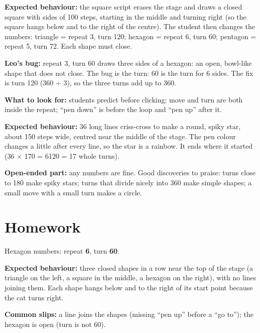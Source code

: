 \begin{answer}
\textbf{Expected behaviour:} the square script erases the stage and draws a closed square with sides of 100 steps, starting in the middle and turning right (so the square hangs below and to the right of the centre). The student then changes the numbers:
triangle = repeat 3, turn 120; hexagon = repeat 6, turn 60; pentagon = repeat 5, turn 72. Each shape must close.

\textbf{Leo's bug:} repeat 3, turn 60 draws three sides of a hexagon: an open, bowl-like shape that does not close. The bug is the turn: 60 is the turn for 6 sides. The fix is turn 120 (360 ÷ 3), so the three turns add up to 360.

\textbf{What to look for:} students predict before clicking; move and turn are both inside the repeat; \enquote{pen down} is before the loop and \enquote{pen up} after it.
\end{answer}

\begin{answer}
\textbf{Expected behaviour:} 36 long lines criss-cross to make a round, spiky star, about 150 steps wide, centred near the middle of the stage. The pen colour changes a little after every line, so the star is a rainbow. It ends where it started (36 × 170 = 6120 = 17 whole turns).

\textbf{Open-ended part:} any numbers are fine. Good discoveries to praise: turns close to 180 make spiky stars; turns that divide nicely into 360 make simple shapes; a small move with a small turn makes a circle.
\end{answer}

\section{Homework}
\begin{answer}
Hexagon numbers: repeat \textbf{6}, turn \textbf{60}.

\textbf{Expected behaviour:} three closed shapes in a row near the top of the stage (a triangle on the left, a square in the middle, a hexagon on the right), with no lines joining them. Each shape hangs below and to the right of its start point because the cat turns right.

\textbf{Common slips:} a line joins the shapes (missing \enquote{pen up} before a \enquote{go to}); the hexagon is open (turn is not 60).
\end{answer}

